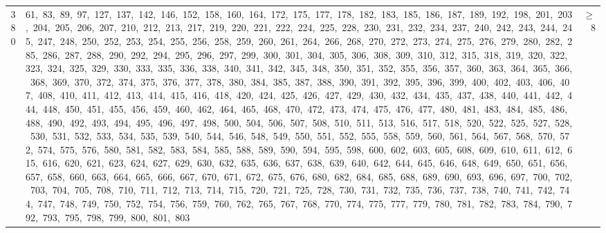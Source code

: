 \begin{longtable}{c|p{}|r}
380 & 61,\ 83,\ 89,\ 97,\ 127,\ 137,\ 142,\ 146,\ 152,\ 158,\ 160,\ 164,\ 172,\ 175,\ 177,\ 178,\ 182,\ 183,\ 185,\ 186,\ 187,\ 189,\ 192,\ 198,\ 201,\ 203,\ 204,\ 205,\ 206,\ 207,\ 210,\ 212,\ 213,\ 217,\ 219,\ 220,\ 221,\ 222,\ 224,\ 225,\ 228,\ 230,\ 231,\ 232,\ 234,\ 237,\ 240,\ 242,\ 243,\ 244,\ 245,\ 247,\ 248,\ 250,\ 252,\ 253,\ 254,\ 255,\ 256,\ 258,\ 259,\ 260,\ 261,\ 264,\ 266,\ 268,\ 270,\ 272,\ 273,\ 274,\ 275,\ 276,\ 279,\ 280,\ 282,\ 285,\ 286,\ 287,\ 288,\ 290,\ 292,\ 294,\ 295,\ 296,\ 297,\ 299,\ 300,\ 301,\ 304,\ 305,\ 306,\ 308,\ 309,\ 310,\ 312,\ 315,\ 318,\ 319,\ 320,\ 322,\ 323,\ 324,\ 325,\ 329,\ 330,\ 333,\ 335,\ 336,\ 338,\ 340,\ 341,\ 342,\ 345,\ 348,\ 350,\ 351,\ 352,\ 355,\ 356,\ 357,\ 360,\ 363,\ 364,\ 365,\ 366,\ 368,\ 369,\ 370,\ 372,\ 374,\ 375,\ 376,\ 377,\ 378,\ 380,\ 384,\ 385,\ 387,\ 388,\ 390,\ 391,\ 392,\ 395,\ 396,\ 399,\ 400,\ 402,\ 403,\ 406,\ 407,\ 408,\ 410,\ 411,\ 412,\ 413,\ 414,\ 415,\ 416,\ 418,\ 420,\ 424,\ 425,\ 426,\ 427,\ 429,\ 430,\ 432,\ 434,\ 435,\ 437,\ 438,\ 440,\ 441,\ 442,\ 444,\ 448,\ 450,\ 451,\ 455,\ 456,\ 459,\ 460,\ 462,\ 464,\ 465,\ 468,\ 470,\ 472,\ 473,\ 474,\ 475,\ 476,\ 477,\ 480,\ 481,\ 483,\ 484,\ 485,\ 486,\ 488,\ 490,\ 492,\ 493,\ 494,\ 495,\ 496,\ 497,\ 498,\ 500,\ 504,\ 506,\ 507,\ 508,\ 510,\ 511,\ 513,\ 516,\ 517,\ 518,\ 520,\ 522,\ 525,\ 527,\ 528,\ 530,\ 531,\ 532,\ 533,\ 534,\ 535,\ 539,\ 540,\ 544,\ 546,\ 548,\ 549,\ 550,\ 551,\ 552,\ 555,\ 558,\ 559,\ 560,\ 561,\ 564,\ 567,\ 568,\ 570,\ 572,\ 574,\ 575,\ 576,\ 580,\ 581,\ 582,\ 583,\ 584,\ 585,\ 588,\ 589,\ 590,\ 594,\ 595,\ 598,\ 600,\ 602,\ 603,\ 605,\ 608,\ 609,\ 610,\ 611,\ 612,\ 615,\ 616,\ 620,\ 621,\ 623,\ 624,\ 627,\ 629,\ 630,\ 632,\ 635,\ 636,\ 637,\ 638,\ 639,\ 640,\ 642,\ 644,\ 645,\ 646,\ 648,\ 649,\ 650,\ 651,\ 656,\ 657,\ 658,\ 660,\ 663,\ 664,\ 665,\ 666,\ 667,\ 670,\ 671,\ 672,\ 675,\ 676,\ 680,\ 682,\ 684,\ 685,\ 688,\ 689,\ 690,\ 693,\ 696,\ 697,\ 700,\ 702,\ 703,\ 704,\ 705,\ 708,\ 710,\ 711,\ 712,\ 713,\ 714,\ 715,\ 720,\ 721,\ 725,\ 728,\ 730,\ 731,\ 732,\ 735,\ 736,\ 737,\ 738,\ 740,\ 741,\ 742,\ 744,\ 747,\ 748,\ 749,\ 750,\ 752,\ 754,\ 756,\ 759,\ 760,\ 762,\ 765,\ 767,\ 768,\ 770,\ 774,\ 775,\ 777,\ 779,\ 780,\ 781,\ 782,\ 783,\ 784,\ 790,\ 792,\ 793,\ 795,\ 798,\ 799,\ 800,\ 801,\ 803 & $\ge$ 8 \\

\end{longtable}
